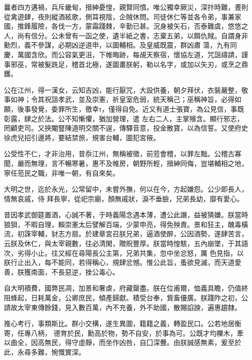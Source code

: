 \begin{pinyinscope}
 曩者四方遘禍，兵斥畿甸，搢紳憂惶，親賢同憤。唯公獨幸厥災，深抃時難，晝則從禽遊肆，夜則縱酒絃歌，側耳視陰，企賊休問。司徒休仁等並各令弟，事兼家國，推鋒履險，各伐一方，蒙霜踐棘，辛勤已甚。況身被矢石，否泰難虞，悠悠之人，尚有信分。公未曾有一函之使，遺半紙之書，志棄五弟，以餌仇賊。自謂身非勳烈，義不參謀，必期凶逆道申，以圖輔相。及皇威既震，群凶肅
 蕩，九有同慶，萬國含欣。而公容氣更沮，下帷晦跡，每覘天察宿，懷協左道，咒詛禱請，謹事邪巫，常被髮跣足，稽首北極，遂圖畫朕躬，勒以名字，或加以矢刃，或烹之鼎鑊。



 公在江州，得一漢女，云知吉凶，能行厭咒，大設供養，朝夕拜伏，衣裝嚴整，敬事如神；令其祝詛孝武，並及崇憲，祈皇室危弱，統天稱己；巫稱神旨，必得如願，後事發覺，委罪所生，徼幸τ，僅得自免。近又有道士張寶，為公見信，事既彰露，肆之於法。公不知慚懼，猶加營理，遣
 左右二人，主掌殯含。顯行邪志，罔顧吏司。又挾閹豎陳道明交關不逞，傳驛音意，投金散寶，以為信誓。又使府史徐虎兒招引邊將，要結禁旅，規害台輔，圖犯宮掖。



 公受性不仁，才非治用，昔忝江州，無稱被徵，前蒞會稽，以罪左黜。公稽古寡聞，嚴而無理，言不暢寒暑，惠不及帷房，朝野所輕，搢紳同侮，豈堪輔相之地，寧任蒞民之職，非唯一朝，有自來矣。



 大明之世，迄於永光，公常留中，未嘗外撫，何以在今，方起嫌怨。公少即長人，情無哀戚，侍
 拜長寧，從祀宗廟，顏無戚狀，淚不垂臉，兄弟長幼，靡有愛心。



 昔因孝武御筵置酒，心誠不著，于時義陽念遇本薄，遭公此譖，益被猜嫌。朕當時狼狽，不暇自理，賴崇憲太后譬解百端，少蒙申亮，得免殃責。景和狂主，醜毒橫流，初誅宰輔，豺志方扇。於建章宮召朕兄弟，逼酒使醉，公因酒勢，遂肆苦言，云朕及休仁，與太宰親數，往必清閑，贈貺豐厚。朕當時惶駭，五內崩墜，于其語次，劣得小止。往又經在尋陽長公主第，兄弟共集，忽中坐忿怒，厲
 色見指，以朕行止出入，每不能同，若得稱心，規肆忿憾。惟公此旨，蚤欲見滅，而天道愛善，朕獲南面，不長惡逆，挫公毒心。



 自大明積費，國弊民凋，加景和奢虐，府藏罄盡。朕在位甫爾，恤義具瞻，仍值終阻蜂起，日耗萬金，公卿庶民，傾產歸獻。積受台奉，貲畜優廣。朕踐阼之初，公請故太宰東傳餘錢，見入數百萬，內不充養，外不助國，散賜諂諛，遍惠趨隸。



 推心考行，事類斯比。群小交構，遂生異圖，籍籍之義，轉盈民口。公若地居衡寄，任專八柄，
 德育於民，勳高於物，勢不自安，於事為可。公既才均櫟木，牽以曲全，因高無民，得守虛靜，而坐作凶咎，自囗深釁。由朕誠感無素，爰至於此，永尋多難，惋慨實深。




\end{pinyinscope}
